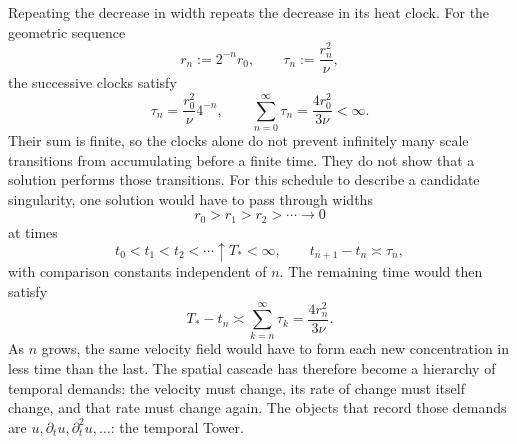 Repeating the decrease in width repeats the decrease in its heat clock.
For the geometric sequence
\[
  r_n:=2^{-n}r_0,
  \qquad
  \tau_n:=\frac{r_n^2}{\nu},
\]
the successive clocks satisfy
\[
  \tau_n
  =
  \frac{r_0^2}{\nu}4^{-n},
  \qquad
  \sum_{n=0}^{\infty}\tau_n
  =
  \frac{4r_0^2}{3\nu}
  <
  \infty.
\]
Their sum is finite, so the clocks alone do not prevent infinitely many scale transitions from accumulating before a finite time.
They do not show that a \NavierStokes{} solution performs those transitions.
For this schedule to describe a candidate singularity, one solution would have to pass through widths
\[
  r_0>r_1>r_2>\cdots\longrightarrow0
\]
at times
\[
  t_0<t_1<t_2<\cdots\uparrow T_*<\infty,
  \qquad
  t_{n+1}-t_n\asymp\tau_n,
\]
with comparison constants independent of \(n\).
The remaining time would then satisfy
\[
  T_*-t_n
  \asymp
  \sum_{k=n}^{\infty}\tau_k
  =
  \frac{4r_n^2}{3\nu}.
\]
As \(n\) grows, the same velocity field would have to form each new concentration in less time than the last.
The spatial cascade has therefore become a hierarchy of temporal demands: the velocity must change, its rate of change must itself change, and that rate must change again.
The objects that record those demands are \(u,\partial_tu,\partial_t^2u,\ldots\): the temporal Tower.

